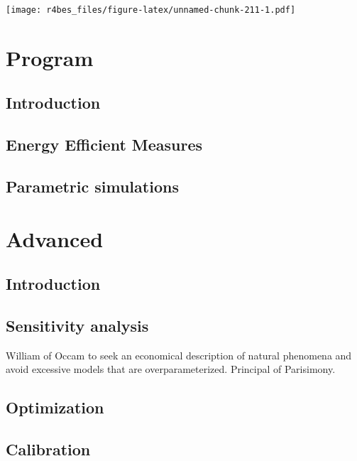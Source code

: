 \documentclass[
]{book}
\begin{document}
\texttt{[image: r4bes\_files/figure-latex/unnamed-chunk-211-1.pdf]}

\hypertarget{part-program}{%
\part{Program}\label{part-program}}

\hypertarget{program}{%
\chapter{Introduction}\label{program}}

\hypertarget{energy-efficient-measures}{%
\chapter{Energy Efficient Measures}\label{energy-efficient-measures}}

\hypertarget{parametric-simulations}{%
\chapter{Parametric simulations}\label{parametric-simulations}}

\hypertarget{part-advanced}{%
\part{Advanced}\label{part-advanced}}

\hypertarget{advanced}{%
\chapter{Introduction}\label{advanced}}

\hypertarget{sensitivity-analysis}{%
\chapter{Sensitivity analysis}\label{sensitivity-analysis}}

William of Occam to seek an economical description of natural phenomena and avoid excessive models that are overparameterized. Principal of Parisimony.

\hypertarget{optimization}{%
\chapter{Optimization}\label{optimization}}

\hypertarget{calibration}{%
\chapter{Calibration}\label{calibration}}
\end{document}
